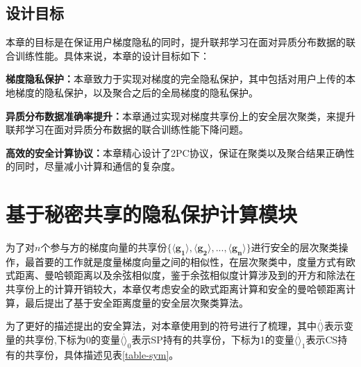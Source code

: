 \subsection{设计目标}
本章的目标是在保证用户梯度隐私的同时，提升联邦学习在面对异质分布数据的联合训练性能。具体来说，本章的设计目标如下：
\begin{compactitem}
    \item \textbf{梯度隐私保护：}本章致力于实现对梯度的完全隐私保护，其中包括对用户上传的本地梯度的隐私保护，以及聚合之后的全局梯度的隐私保护。
    \item \textbf{异质分布数据准确率提升：}本章通过实现对梯度共享份上的安全层次聚类，来提升联邦学习在面对异质分布数据的联合训练性能下降问题。
    \item \textbf{高效的安全计算协议：}本章精心设计了2PC协议，保证在聚类以及聚合结果正确性的同时，尽量减小计算和通信的复杂度。
\end{compactitem}

\section{基于秘密共享的隐私保护计算模块}\label{4-building}
为了对$n$个参与方的梯度向量的共享份$\{\boldsymbol{\langle g_1\rangle}, \boldsymbol{\langle g_2\rangle},...,\boldsymbol{\langle g_n\rangle} \}$进行安全的层次聚类操作，最首要的工作就是度量梯度向量之间的相似性，在层次聚类中，度量方式有欧式距离、曼哈顿距离以及余弦相似度，鉴于余弦相似度计算涉及到的开方和除法在共享份上的计算开销较大，本章仅考虑安全的欧式距离计算和安全的曼哈顿距离计算，最后提出了基于安全距离度量的安全层次聚类算法。

为了更好的描述提出的安全算法，对本章使用到的符号进行了梳理，其中$\langle \dot\rangle$表示变量的共享份,下标为0的变量$\langle \dot\rangle_0$表示SP持有的共享份，下标为1的变量$\langle \dot\rangle_1$表示CS持有的共享份，具体描述见表\ref{table-sym}。

